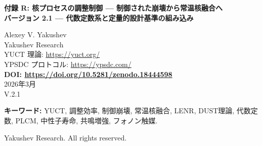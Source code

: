 \documentclass[12pt]{article}
\newcommand{\Keff}{K_{\mathrm{eff}}}
\newcommand{\df}{d_{\!f}}
\newcommand{\Kcrit}{K_{\mathrm{crit}}}
\newcommand{\Sodd}{S_{\mathrm{odd}}}
\newcommand{\Seven}{S_{\mathrm{even}}}
\theoremstyle{remark}
\begin{document}
	
	\begin{titlepage}
		\begin{center}
			\vspace*{0cm}
			
			\Huge\textbf{付録 R: 核プロセスの調整制御 — 制御された崩壊から常温核融合へ} \\
			\vspace{0.5cm}
			\Large\textbf{バージョン 2.1 — 代数定数系と定量的設計基準の組み込み}
			\vspace{2cm}
			
			\large Alexey V. Yakushev\\
			Yakushev Research\\
			YUCT 理論: \url{https://yuct.org/}\\
			YPSDC プロトコル: \url{https://ypsdc.com/}\\
			\vspace{1cm}
			\textbf{DOI: \url{https://doi.org/10.5281/zenodo.18444598}}\\
			\vspace{1cm}
			2026年3月 \\ \large V.2.1
			\newpage
			\begin{abstract}
				\noindent
				本付録は、Yakushev 統一調整理論 (YUCT) を核および亜核プロセスに拡張する。普遍誤差スケーリング則 \(\varepsilon = \kappa_c \alpha \Keff^{-\beta}\)（\(\beta = 2/3\), \(\kappa_c = 1/3\)）から出発し、外部場および共鳴励起下での崩壊率、トンネル確率、融合断面積の修正を導出する。中心的な結果は、低エネルギー核反応 (LENR, 常温核融合) の臨界条件 \(\Keff > \Kcrit = (E_{\text{Coulomb}}/E_{\text{coord}})^{\df}\) である。最近導出された代数定数系 \(\beta = 2/3\), \(\Sodd = 6/5 = 1.2\), \(\Seven = 4/5 = 0.8\) およびそれらの関係 \(\Sodd+\Seven=2\), \(\Sodd/\Seven = 1/\beta = 3/2\) を用いて、定量的設計基準を得る：コヒーレント（一方向）相関の割合は \(60\%\) を超えなければならず、コヒーレント応答とインコヒーレント応答の比は \(1.5\) に近づかなければならない。これらの基準は LENR を投機的探索から測定可能な目標を持つ工学課題へと変える。これらの定数が協調物質の周期ラグランジアン (PLCM) とともにどのように系統的材料スクリーニングと閉ループ制御を可能にするかを示す。独立した枠組み (DUST) および既存の実験的兆候（異常スクリーニング、核異性体）との一致について議論する。現実的な確率推定（5–10年以内の成功率 30–40\%）を伴う段階的ロードマップを概説する。
			\end{abstract}
			
			\vspace{0.3cm}
			
			\noindent
			\small\textbf{キーワード:} YUCT, 調整効率, 制御崩壊, 常温核融合, LENR, DUST理論, 代数定数, PLCM, 中性子寿命, 共鳴増強, フォノン触媒.
			
			\vspace{0.1cm}
			
			\noindent
			 Yakushev Research. All rights reserved.
		\end{center}
	\end{titlepage}
	
\end{document}
